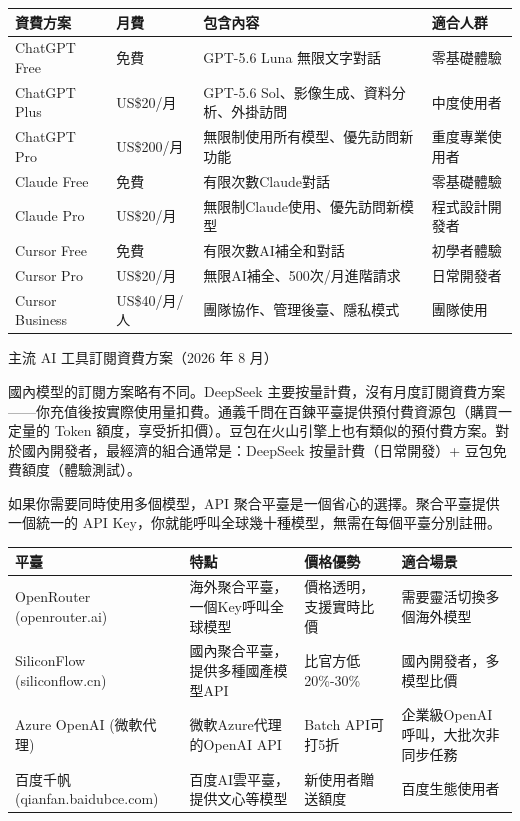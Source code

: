 \begin{center}
\begin{tabularx}{\linewidth}{|X|X|X|X|}
\hline
\textbf{資費方案} & \textbf{月費} & \textbf{包含內容} & \textbf{適合人群} \tabularnewline
\hline
ChatGPT Free & 免費 & GPT-5.6 Luna 無限文字對話 & 零基礎體驗 \tabularnewline
ChatGPT Plus & US\$20/月 & GPT-5.6 Sol、影像生成、資料分析、外掛訪問 & 中度使用者 \tabularnewline
ChatGPT Pro & US\$200/月 & 無限制使用所有模型、優先訪問新功能 & 重度專業使用者 \tabularnewline
Claude Free & 免費 & 有限次數Claude對話 & 零基礎體驗 \tabularnewline
Claude Pro & US\$20/月 & 無限制Claude使用、優先訪問新模型 & 程式設計開發者 \tabularnewline
Cursor Free & 免費 & 有限次數AI補全和對話 & 初學者體驗 \tabularnewline
Cursor Pro & US\$20/月 & 無限AI補全、500次/月進階請求 & 日常開發者 \tabularnewline
Cursor Business & US\$40/月/人 & 團隊協作、管理後臺、隱私模式 & 團隊使用 \tabularnewline
\hline
\end{tabularx}
\end{center}

\begin{center}\small\color{gray}主流 AI 工具訂閱資費方案（2026 年 8 月）\end{center}

國內模型的訂閱方案略有不同。DeepSeek 主要按量計費，沒有月度訂閱資費方案——你充值後按實際使用量扣費。通義千問在百鍊平臺提供預付費資源包（購買一定量的 Token 額度，享受折扣價）。豆包在火山引擎上也有類似的預付費方案。對於國內開發者，最經濟的組合通常是：DeepSeek 按量計費（日常開發）+ 豆包免費額度（體驗測試）。


如果你需要同時使用多個模型，API 聚合平臺是一個省心的選擇。聚合平臺提供一個統一的 API Key，你就能呼叫全球幾十種模型，無需在每個平臺分別註冊。

\begin{center}
\begin{tabularx}{\linewidth}{|X|X|X|X|}
\hline
\textbf{平臺} & \textbf{特點} & \textbf{價格優勢} & \textbf{適合場景} \tabularnewline
\hline
OpenRouter (openrouter.ai) & 海外聚合平臺，一個Key呼叫全球模型 & 價格透明，支援實時比價 & 需要靈活切換多個海外模型 \tabularnewline
SiliconFlow (siliconflow.cn) & 國內聚合平臺，提供多種國產模型API & 比官方低20\%-30\% & 國內開發者，多模型比價 \tabularnewline
Azure OpenAI (微軟代理) & 微軟Azure代理的OpenAI API & Batch API可打5折 & 企業級OpenAI呼叫，大批次非同步任務 \tabularnewline
百度千帆 (qianfan.baidubce.com) & 百度AI雲平臺，提供文心等模型 & 新使用者贈送額度 & 百度生態使用者 \tabularnewline
\hline
\end{tabularx}
\end{center}

